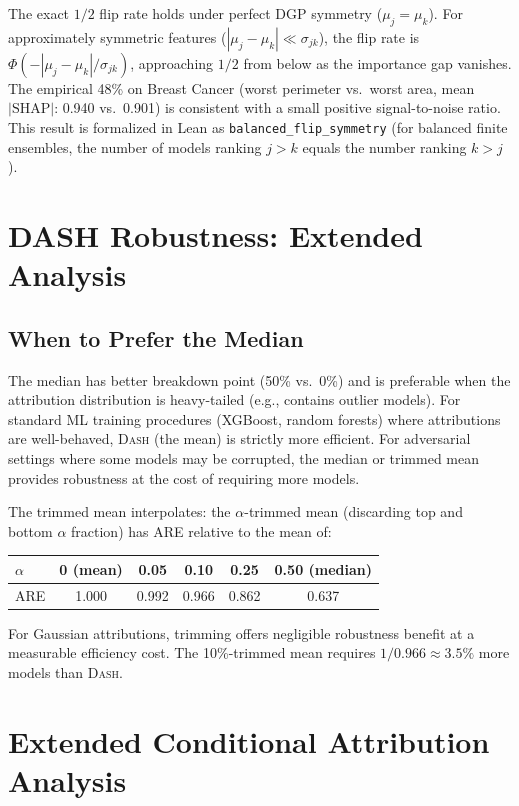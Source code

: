 \documentclass{article}
\newcommand{\SHAP}{\mathrm{SHAP}}
\newcommand{\DASH}{\textsc{Dash}}
\begin{document}
The exact $1/2$ flip rate holds under perfect DGP symmetry ($\mu_j = \mu_k$). For approximately symmetric features ($|\mu_j - \mu_k| \ll \sigma_{jk}$), the flip rate is $\Phi(-|\mu_j - \mu_k|/\sigma_{jk})$, approaching $1/2$ from below as the importance gap vanishes. The empirical 48\% on Breast Cancer (worst perimeter vs.\ worst area, mean $|\SHAP|$: 0.940 vs.\ 0.901) is consistent with a small positive signal-to-noise ratio. This result is formalized in Lean as \texttt{balanced\_flip\_symmetry} (for balanced finite ensembles, the number of models ranking $j > k$ equals the number ranking $k > j$).

\section{DASH Robustness: Extended Analysis}

\subsection{When to Prefer the Median}

The median has better breakdown point (50\% vs.\ 0\%) and is preferable when the attribution distribution is heavy-tailed (e.g., contains outlier models). For standard ML training procedures (XGBoost, random forests) where attributions are well-behaved, \DASH{} (the mean) is strictly more efficient. For adversarial settings where some models may be corrupted, the median or trimmed mean provides robustness at the cost of requiring more models.

The trimmed mean interpolates: the $\alpha$-trimmed mean (discarding top and bottom $\alpha$ fraction) has ARE relative to the mean of:

\begin{center}
\small
\begin{tabular}{@{}lccccc@{}}
\toprule
$\alpha$ & 0 (mean) & 0.05 & 0.10 & 0.25 & 0.50 (median) \\
\midrule
ARE & 1.000 & 0.992 & 0.966 & 0.862 & 0.637 \\
\bottomrule
\end{tabular}
\end{center}

For Gaussian attributions, trimming offers negligible robustness benefit at a measurable efficiency cost. The 10\%-trimmed mean requires $1/0.966 \approx 3.5\%$ more models than \DASH{}.

\section{Extended Conditional Attribution Analysis}
\end{document}
